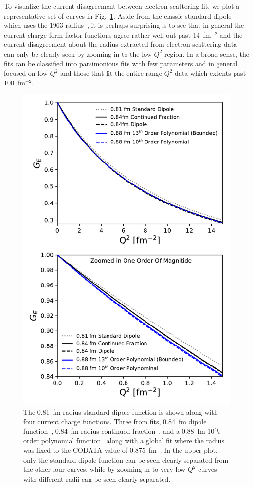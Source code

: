 \documentclass[10pt,aps,prc,twocolumn]{revtex4-1}
\begin{document}
To visualize the current disagreement between electron scattering fit, we plot a representative set of curves in Fig.~\ref{TwoOrders}.
Aside from the classic standard dipole which uses the 1963 radius~\cite{Hand:1963zz}, it is  perhaps surprising is to see that 
in general the current charge form factor functions agree rather well out past 14~fm$^{-2}$ and the current disagreement about the
radius extracted from electron scattering data can only be clearly seen by zooming-in to the low $Q^2$ region.
In a broad sense, the fits can be classified into parsimonious fits with few parameters and in general focused on low $Q^2$ and
those that fit the entire range $Q^2$ data which extents past 100~fm$^{-2}$.

\begin{figure}
\includegraphics[width=\columnwidth]{Figure/TwoOrders.pdf}
\caption{The 0.81~fm radius standard dipole function is shown along with four current charge functions.
Three from fits, 0.84~fm dipole function~\cite{Higinbotham:2015rja}, 0.84~fm radius continued fraction~\cite{Griffioen:2015hta},
and a 0.88~fm 10$^th$ order polynomial function~\cite{Bernauer:2010wm} along with a global fit where the radius was fixed
to the CODATA value of 0.875~fm~\cite{Ye:2017gyb}.   In the upper plot, only the standard dipole function can be seen clearly
separated from the other four curves, while by zooming in to very low $Q^2$ curves with different radii can be seen clearly
separated.}
\label{TwoOrders}
\end{figure}
\end{document}
